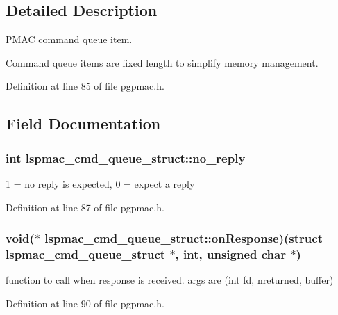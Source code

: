\subsection{Detailed Description}
P\-M\-A\-C command queue item. 

Command queue items are fixed length to simplify memory management. 

Definition at line 85 of file pgpmac.\-h.



\subsection{Field Documentation}
\hypertarget{structlspmac__cmd__queue__struct_a33f70b45f8b7c27935cd3efe28748479}{
\subsubsection[{no\-\_\-reply}]{\setlength{\rightskip}{0pt plus 5cm}int lspmac\-\_\-cmd\-\_\-queue\-\_\-struct\-::no\-\_\-reply}}\label{structlspmac__cmd__queue__struct_a33f70b45f8b7c27935cd3efe28748479}


1 = no reply is expected, 0 = expect a reply 



Definition at line 87 of file pgpmac.\-h.

\hypertarget{structlspmac__cmd__queue__struct_afe92c0bab9f124314a6f3d8104c94364}{
\subsubsection[{on\-Response}]{\setlength{\rightskip}{0pt plus 5cm}void($\ast$ lspmac\-\_\-cmd\-\_\-queue\-\_\-struct\-::on\-Response)(struct {\bf lspmac\-\_\-cmd\-\_\-queue\-\_\-struct} $\ast$, int, unsigned char $\ast$)}}\label{structlspmac__cmd__queue__struct_afe92c0bab9f124314a6f3d8104c94364}


function to call when response is received. args are (int fd, nreturned, buffer) 



Definition at line 90 of file pgpmac.\-h.

